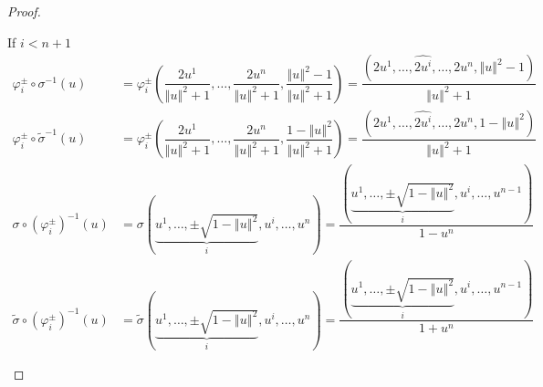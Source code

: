 \begin{proof}
\begin{enumerate}[itemsep=0pt,label={(\alph*)}]
              If \( i < n + 1 \)
              \begingroup
              \allowdisplaybreaks%
              \begin{align*}
                  \varphi_{i}^{\pm} \circ \sigma^{-1}(u)                 & = \varphi_{i}^{\pm}\left( \dfrac{2 u^{1}}{{\left\Vert u \right\Vert}^{2} + 1}, \ldots, \dfrac{2 u^{n}}{{\left\Vert u \right\Vert}^{2} + 1}, \dfrac{{\left\Vert u \right\Vert}^{2} - 1}{{\left\Vert u \right\Vert}^{2} + 1} \right) = \dfrac{(2 u^{1}, \ldots, \widehat{2 u^{i}}, \ldots, 2 u^{n}, {\left\Vert u \right\Vert}^{2} - 1)}{{\left\Vert u \right\Vert}^{2} + 1} \\
                  \varphi_{i}^{\pm} \circ \widetilde{\sigma}^{-1}(u)     & = \varphi_{i}^{\pm}\left( \dfrac{2 u^{1}}{{\left\Vert u \right\Vert}^{2} + 1}, \ldots, \dfrac{2 u^{n}}{{\left\Vert u \right\Vert}^{2} + 1}, \dfrac{1 - {\left\Vert u \right\Vert}^{2}}{{\left\Vert u \right\Vert}^{2} + 1} \right) = \dfrac{(2 u^{1}, \ldots, \widehat{2 u^{i}}, \ldots, 2 u^{n}, 1 - {\left\Vert u \right\Vert}^{2})}{{\left\Vert u \right\Vert}^{2} + 1} \\
                  \sigma \circ {(\varphi_{i}^{\pm})}^{-1}(u)             & = \sigma\left(\underbrace{u^{1}, \ldots, \pm\sqrt{1 - {\left\Vert u \right\Vert}^{2}}}_{i}, u^{i}, \ldots, u^{n}\right) = \dfrac{\left(\underbrace{u^{1}, \ldots, \pm\sqrt{1 - {\left\Vert u \right\Vert}^{2}}}_{i}, u^{i}, \ldots, u^{n-1}\right)}{1 - u^{n}}                                                                                                             \\
                  \widetilde{\sigma} \circ {(\varphi_{i}^{\pm})}^{-1}(u) & = \widetilde{\sigma}\left(\underbrace{u^{1}, \ldots, \pm\sqrt{1 - {\left\Vert u \right\Vert}^{2}}}_{i}, u^{i}, \ldots, u^{n}\right) = \dfrac{\left(\underbrace{u^{1}, \ldots, \pm\sqrt{1 - {\left\Vert u \right\Vert}^{2}}}_{i}, u^{i}, \ldots, u^{n-1}\right)}{1 + u^{n}}
              \end{align*}
              \endgroup


\end{enumerate}
\end{proof}
